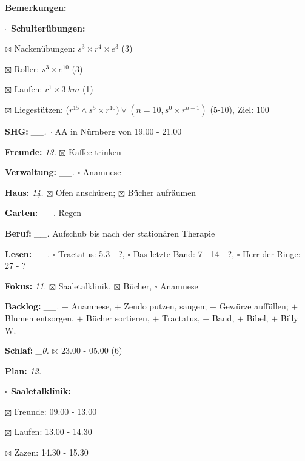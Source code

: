 \documentclass[10pt,a4paper]{article}
\newcommand\prop[1] {{\color {alizarin} {\bf #1}}}             %
\newcommand\mand[1] {{\color {burntorange} {\bf #1}}}          %
\newcommand\topspace{\vskip -15pt \hskip 20pt}
\newcommand\bottomspace{\vskip 4pt}
\newcommand\n[1] { {\sl #1.} \hskip 5pt }
\begin{document}
\begin{mdframed}[style=daystyle]
\begin{labeling}{{\mand {Bemerkungen:}}}
\begin{minipage}{0.75\textwidth}
\begin{labeling}{\prop {$\square$ {Schulterübungen:}}}
      \item[$\boxtimes$ Nackenübungen:]   $s^3 \times r^4 \times e^3$ (3)
      \item[$\boxtimes$ Roller:]          $s^3 \times e^{10}$ (3)
      \item[$\boxtimes$ Laufen:]          $r^1 \times 3\ km$ (1)
      \item[$\boxtimes$ Liegestützen:]    ($r^{15} \land s^5 \times r^{10}) \vee (n=10, s^0 \times r^{n-1})$ (5-10), Ziel: 100
      \end{labeling}
    \end{minipage}
    \bottomspace        
  \item[{\mand {SHG:}}]          \n{\_\_} $\square$ AA in Nürnberg von 19.00 - 21.00
  \item[{\mand {Freunde:}}]        \n{13} $\boxtimes$ Kaffee trinken
  \item[{\mand {Verwaltung:}}]   \n{\_\_} $\square$ Anamnese
  \item[{\mand {Haus:}}]           \n{14} $\boxtimes$ Ofen anschüren; $\boxtimes$ Bücher aufräumen
  \item[{\mand {Garten:}}]       \n{\_\_} Regen
  \item[{\mand {Beruf:}}]        \n{\_\_} Aufschub bis nach der stationären Therapie
  \item[{\mand {Lesen:}}]        \n{\_\_} $\square$ Tractatus: 5.3 - ?,
      $\square$ Das letzte Band: 7 - 14 - ?, $\square$ Herr der Ringe: 27 - ?
  \item[{\mand {Fokus:}}]          \n{11} $\boxtimes$ Saaletalklinik, $\boxtimes$ Bücher, $\square$ Anamnese
  \item[{\mand {Backlog:}}]      \n{\_\_} 
    $+$ Anamnese,
    $+$ Zendo putzen, saugen; $+$ Gewürze auffüllen; $+$ Blumen entsorgen, $+$ Bücher sortieren,
    $+$ Tractatus, $+$ Band, $+$ Bibel, $+$ Billy W.
  \item[{\mand {Schlaf:}}]        \n{\_0} $\boxtimes$ 23.00 - 05.00 (6)
  \item[{\mand {Plan:}}]           \n{12}
    \topspace
    \begin{minipage}{0.75\textwidth}  
      \begin{labeling}{\prop {$\square$ {Saaletalklinik:}}} 
        \setlength\itemsep{-3pt}
      \item[$\boxtimes$ Freunde:]        09.00 - 13.00
      \item[$\boxtimes$ Laufen:]         13.00 - 14.30
      \item[$\boxtimes$ Zazen:]          14.30 - 15.30        

\end{labeling}
\end{minipage}
\end{labeling}
\end{mdframed}
\end{document}
